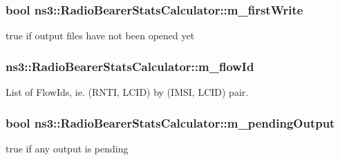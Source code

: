 \subsubsection[{\texorpdfstring{m\+\_\+first\+Write}{m_firstWrite}}]{\setlength{\rightskip}{0pt plus 5cm}bool ns3\+::\+Radio\+Bearer\+Stats\+Calculator\+::m\+\_\+first\+Write\hspace{0.3cm}{\ttfamily [private]}}\hypertarget{classns3_1_1RadioBearerStatsCalculator_aa70fad319972ebea7e1fba266efdaf6a}{}\label{classns3_1_1RadioBearerStatsCalculator_aa70fad319972ebea7e1fba266efdaf6a}
true if output files have not been opened yet 
\subsubsection[{\texorpdfstring{m\+\_\+flow\+Id}{m_flowId}}]{ ns3\+::\+Radio\+Bearer\+Stats\+Calculator\+::m\+\_\+flow\+Id\hspace{0.3cm}{\ttfamily [private]}}\hypertarget{classns3_1_1RadioBearerStatsCalculator_aab26a340278a0dcfb541f2d98917c9a0}{}\label{classns3_1_1RadioBearerStatsCalculator_aab26a340278a0dcfb541f2d98917c9a0}


List of Flow\+Ids, ie. (R\+N\+TI, L\+C\+ID) by (I\+M\+SI, L\+C\+ID) pair. 

\subsubsection[{\texorpdfstring{m\+\_\+pending\+Output}{m_pendingOutput}}]{\setlength{\rightskip}{0pt plus 5cm}bool ns3\+::\+Radio\+Bearer\+Stats\+Calculator\+::m\+\_\+pending\+Output\hspace{0.3cm}{\ttfamily [private]}}\hypertarget{classns3_1_1RadioBearerStatsCalculator_aeb0fc0f587b9d6e55e8e37de4cdb4059}{}\label{classns3_1_1RadioBearerStatsCalculator_aeb0fc0f587b9d6e55e8e37de4cdb4059}
true if any output is pending 
